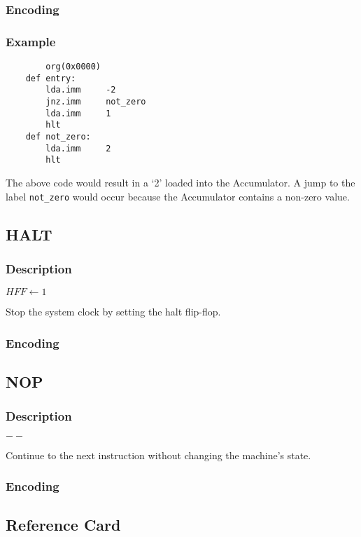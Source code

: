     \subsubsection{Encoding}

    \subsubsection{Example}
    \begin{verbatim}
        org(0x0000)
    def entry:
        lda.imm     -2
        jnz.imm     not_zero
        lda.imm     1
        hlt
    def not_zero:
        lda.imm     2
        hlt
    \end{verbatim}
    The above code would result in a `2' loaded into the Accumulator.
    A jump to the label \texttt{not\_zero} would occur because the Accumulator
    contains a non-zero value.

\pagebreak
\subsection{HALT}\label{subsec:halt}
    \subsubsection{Description}
    $HFF \leftarrow 1$
    \par Stop the system clock by setting the halt flip-flop.
    \subsubsection{Encoding}

\subsection{NOP}\label{subsec:nop}
    \subsubsection{Description}
    $ -- $
    \par Continue to the next instruction without changing the machine's state.
    \subsubsection{Encoding}

\subsection{Reference Card}\label{subsec:reference-card2}